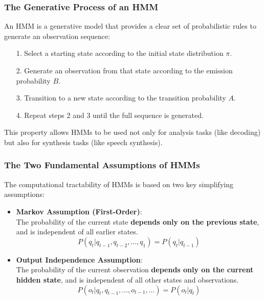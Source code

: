\documentclass[aspectratio=43, 9pt]{beamer}
\begin{document}
\begin{frame}
    \frametitle{The Generative Process of an HMM}
    \begin{Takeaway}
        An HMM is a generative model that provides a clear set of probabilistic rules to generate an observation sequence:
        \begin{itemize}
            \item[1.] Select a starting state according to the initial state distribution $\pi$.
            \item[2.] Generate an observation from that state according to the emission probability $B$.
            \item[3.] Transition to a new state according to the transition probability $A$.
            \item[4.] Repeat steps 2 and 3 until the full sequence is generated.
        \end{itemize}
        This property allows HMMs to be used not only for analysis tasks (like decoding) but also for synthesis tasks (like speech synthesis).
    \end{Takeaway}
\end{frame}

\begin{frame}
    \frametitle{The Two Fundamental Assumptions of HMMs}
    \begin{NewDefinition}
        The computational tractability of HMMs is based on two key simplifying assumptions:
        \begin{itemize}
            \item \textbf{Markov Assumption (First-Order)}: \\
            The probability of the current state \textbf{depends only on the previous state}, and is independent of all earlier states.
            $$P(q_t | q_{t-1}, q_{t-2},..., q_1) = P(q_t | q_{t-1})$$
            
            \vspace{1em}
            
            \item \textbf{Output Independence Assumption}: \\
            The probability of the current observation \textbf{depends only on the current hidden state}, and is independent of all other states and observations.
            $$P(o_t | q_t, q_{t-1},..., o_{t-1},...) = P(o_t | q_t)$$
        \end{itemize}
    \end{NewDefinition}
\end{frame}
\end{document}
